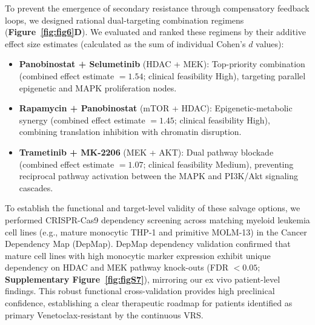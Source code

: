 \documentclass[11pt,a4paper]{article}
\begin{document}
To prevent the emergence of secondary resistance through compensatory feedback loops, we designed rational dual-targeting combination regimens (\textbf{Figure~\ref{fig:fig6}D}). We evaluated and ranked these regimens by their additive effect size estimates (calculated as the sum of individual Cohen's $d$ values):
\begin{itemize}
\item \textbf{Panobinostat + Selumetinib} (HDAC + MEK): Top-priority combination (combined effect estimate $= 1.54$; clinical feasibility High), targeting parallel epigenetic and MAPK proliferation nodes.
\item \textbf{Rapamycin + Panobinostat} (mTOR + HDAC): Epigenetic-metabolic synergy (combined effect estimate $= 1.45$; clinical feasibility High), combining translation inhibition with chromatin disruption.
\item \textbf{Trametinib + MK-2206} (MEK + AKT): Dual pathway blockade (combined effect estimate $= 1.07$; clinical feasibility Medium), preventing reciprocal pathway activation between the MAPK and PI3K\slash\allowbreak Akt signaling cascades.
\end{itemize}

To establish the functional and target-level validity of these salvage options, we performed CRISPR-Cas9 dependency screening across matching myeloid leukemia cell lines (e.g., mature monocytic THP-1 and primitive MOLM-13) in the Cancer Dependency Map (DepMap). DepMap dependency validation confirmed that mature cell lines with high monocytic marker expression exhibit unique dependency on HDAC and MEK pathway knock-outs (FDR $< 0.05$; \textbf{Supplementary Figure~\ref{fig:figS7}}), mirroring our ex vivo patient-level findings. This robust functional cross-validation provides high preclinical confidence, establishing a clear therapeutic roadmap for patients identified as primary Venetoclax-resistant by the continuous VRS.
\end{document}
